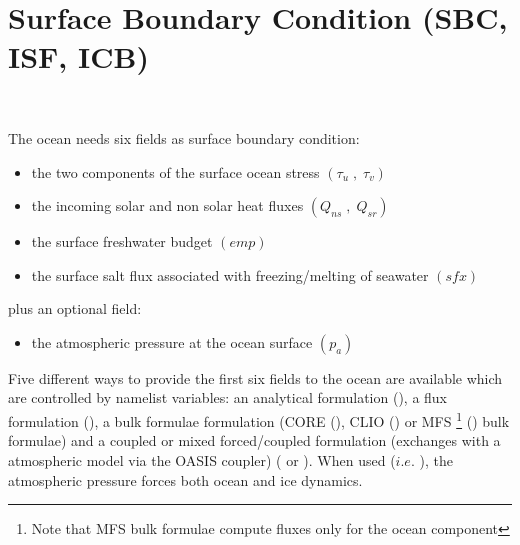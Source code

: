 \documentclass[../tex_main/NEMO_manual]{subfiles}
\begin{document}
\chapter{Surface Boundary Condition (SBC, ISF, ICB) }
\label{chap:SBC}
\minitoc

\newpage
$\ $\newline    %
$\ $\newline    %

The ocean needs six fields as surface boundary condition:
\begin{itemize}
	\item the two components of the surface ocean stress $\left( {\tau _u \;,\;\tau _v} \right)$
	\item the incoming solar and non solar heat fluxes $\left( {Q_{ns} \;,\;Q_{sr} } \right)$
	\item the surface freshwater budget $\left( {\textit{emp}} \right)$
	\item the surface salt flux associated with freezing/melting of seawater $\left( {\textit{sfx}} \right)$
\end{itemize}
plus an optional field:
\begin{itemize}
	\item the atmospheric pressure at the ocean surface $\left( p_a \right)$
\end{itemize}

Five different ways to provide the first six fields to the ocean are available which 
are controlled by namelist  variables: an analytical formulation (), 
a flux formulation (), a bulk formulae formulation (CORE 
(), CLIO () or MFS
\footnote { Note that MFS bulk formulae compute fluxes only for the ocean component}
() bulk formulae) and a coupled or mixed forced/coupled formulation 
(exchanges with a atmospheric model via the OASIS coupler) ( or ). 
When used ($i.e.$ ), the atmospheric pressure forces both ocean and ice dynamics.
\end{document}
